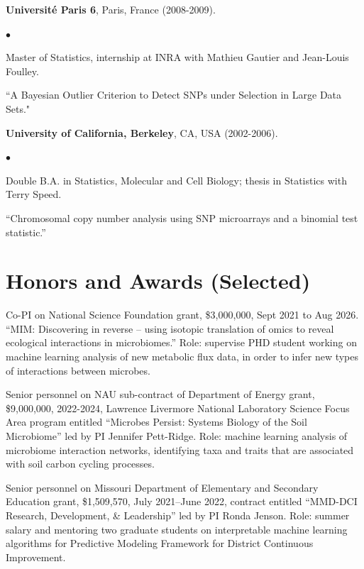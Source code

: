 \documentclass[margin,line]{res}
\newenvironment{list2}{
  \begin{list}{$\bullet$}{%
      \setlength{\itemsep}{0in}
      \setlength{\parsep}{0in} \setlength{\parskip}{0in}
      \setlength{\topsep}{0in} \setlength{\partopsep}{0in} 
      \setlength{\leftmargin}{0.2in}}}{\end{list}}
\begin{document}
\begin{resume}
{\bf Universit\'e Paris 6}, Paris, France (2008-2009).\\
\vspace*{-.1in}
\begin{list2}
\item[] Master of Statistics, internship at INRA with Mathieu Gautier and Jean-Louis Foulley.
\item[] ``A Bayesian Outlier Criterion to Detect SNPs under Selection in Large Data Sets."
\end{list2}

{\bf University of California, Berkeley}, CA, USA (2002-2006).\\
\vspace*{-.1in}
\begin{list2}
\item[] Double B.A. in Statistics, Molecular and Cell Biology; thesis in Statistics with Terry Speed.
\item[] ``Chromosomal copy number analysis using SNP microarrays and a binomial test statistic.'' 
\end{list2}

\section{\sc Honors and Awards (Selected)}

Co-PI on National Science Foundation grant, \$3,000,000, Sept 2021 to
Aug 2026. ``MIM: Discovering in reverse – using isotopic translation
of omics to reveal ecological interactions in microbiomes.'' Role:
supervise PHD student working on machine learning analysis of new
metabolic flux data, in order to infer new types of interactions
between microbes.

Senior personnel on NAU sub-contract of Department of Energy grant,
\$9,000,000, 2022-2024, Lawrence Livermore National Laboratory
Science Focus Area program entitled ``Microbes Persist: Systems
Biology of the Soil Microbiome'' led by PI Jennifer
Pett-Ridge. Role: machine learning analysis of microbiome
interaction networks, identifying taxa and traits that are associated
with soil carbon cycling processes.

Senior personnel on Missouri Department of Elementary and Secondary
Education grant, \$1,509,570, July 2021--June 2022, contract entitled
``MMD-DCI Research, Development, \& Leadership'' led by PI Ronda
Jenson. Role: summer salary and mentoring two graduate students on
interpretable machine learning algorithms for Predictive Modeling
Framework for District Continuous Improvement.


\end{resume}
\end{document}
